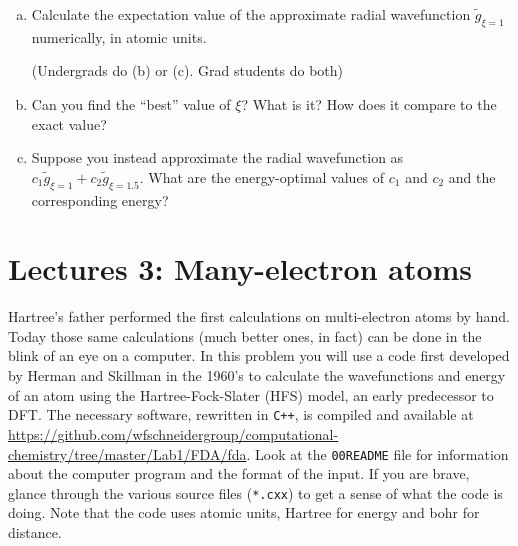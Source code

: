 \documentclass[11pt]{article}
\begin{document}
\begin{enumerate}[(a)]
\item Calculate the expectation value of the approximate radial wavefunction \(\tilde{g}_{\xi=1}\) numerically, in atomic units.

(Undergrads do (b) or (c).  Grad students do both)
\item Can you find the ``best'' value of \(\xi\)?  What is it?  How does it compare to the exact value?

\item Suppose you instead approximate the radial wavefunction as \(c_1 \tilde{g}_{\xi=1} +c_2 \tilde{g}_{\xi=1.5}\).  What are the energy-optimal values of \(c_1\) and \(c_2\) and the corresponding energy?
\end{enumerate}


\section{Lectures 3: Many-electron atoms}
\label{sec:org26e266c}
Hartree’s father performed the first calculations on multi-electron atoms by
hand. Today those same calculations (much better ones, in fact) can be done in
the blink of an eye on a computer. In this problem you will use a code first
developed by Herman and Skillman in the 1960’s to calculate the wavefunctions
and energy of an atom using the Hartree-Fock-Slater (HFS) model, an early
predecessor to DFT. The necessary software, rewritten in \texttt{C++}, is compiled and
available at
\url{https://github.com/wfschneidergroup/computational-chemistry/tree/master/Lab1/FDA/fda}. Look
at the \texttt{00README} file for information about the computer program and the
format of the input. If you are brave, glance through the various source files
(\texttt{*.cxx}) to get a sense of what the code is doing. Note that the code uses
atomic units, Hartree for energy and bohr for distance.
\end{document}
